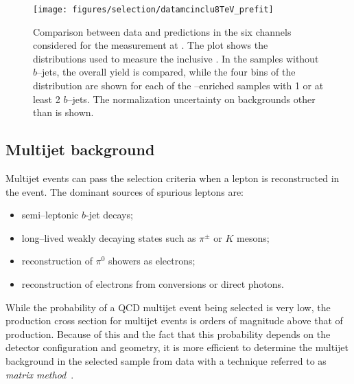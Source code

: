 \begin{figure}\centering
  \texttt{[image: figures/selection/datamcinclu8TeV\_prefit]}
  \caption{
   Comparison between data and predictions in the six channels
   considered for the measurement at \eighttev{}. The plot shows the
   distributions used to measure the inclusive \ac{}. In the samples
   without $b$--jets, the overall yield is compared, while the four bins
   of the \dy{} distribution are shown for each of the
   \ttbar{}--enriched samples with 1 or at least 2 $b$--jets. The
   normalization uncertainty on backgrounds other than \wjets{} is shown. 
  }
  \label{fig:datamc_prefit}
\end{figure}

\subsection{Multijet background}
\label{sec:qcdbckg}

Multijet events can pass the selection criteria when a lepton is
reconstructed in the event. The dominant sources of spurious leptons
are:
\begin{itemize}
\item semi--leptonic $b$-jet decays;
\item long--lived weakly decaying states such as $\pi^{\pm}$ or $K$
  mesons;
\item reconstruction of $\pi^0$ showers as electrons;
\item reconstruction of electrons from conversions or direct photons.
\end{itemize}

While the probability of a QCD multijet event being selected is very
low, the production cross section for multijet events is orders of
magnitude above that of \ttbar{} production.
Because of this and the fact that this probability depends on the
detector configuration and geometry, it is more efficient to
determine the multijet background in the selected sample from data
with a technique referred to as {\it matrix method}~\cite{matrixmethod}.

